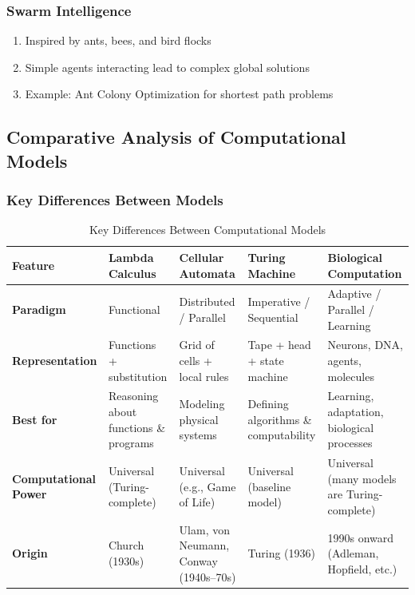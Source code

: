 \subsubsection{Swarm Intelligence}
\label{subsubsec:swarm-intelligence}

\begin{enumerate}
\item Inspired by ants, bees, and bird flocks
\item Simple agents interacting lead to complex global solutions
\item Example: Ant Colony Optimization for shortest path problems
\end{enumerate}

\subsection{Comparative Analysis of Computational Models}
\label{subsec:comparative-analysis}

\subsubsection{Key Differences Between Models}
\label{subsubsec:key-differences-models}

\begin{table}[h!]
\centering
\scriptsize
\begin{tabular}{|p{2cm}|p{2.5cm}|p{2.5cm}|p{2.5cm}|p{3cm}|}
\hline
\textbf{Feature} & \textbf{Lambda Calculus} & \textbf{Cellular Automata} & \textbf{Turing Machine} & \textbf{Biological Computation} \\
\hline
\textbf{Paradigm} & Functional & Distributed / Parallel & Imperative / Sequential & Adaptive / Parallel / Learning \\
\hline
\textbf{Representation} & Functions + substitution & Grid of cells + local rules & Tape + head + state machine & Neurons, DNA, agents, molecules \\
\hline
\textbf{Best for} & Reasoning about functions \& programs & Modeling physical systems & Defining algorithms \& computability & Learning, adaptation, biological processes \\
\hline
\textbf{Computational Power} & Universal (Turing-complete) & Universal (e.g., Game of Life) & Universal (baseline model) & Universal (many models are Turing-complete) \\
\hline
\textbf{Origin} & Church (1930s) & Ulam, von Neumann, Conway (1940s–70s) & Turing (1936) & 1990s onward (Adleman, Hopfield, etc.) \\
\hline
\end{tabular}
\caption{Key Differences Between Computational Models}
\label{tab:computational-models-comparison}
\end{table}


